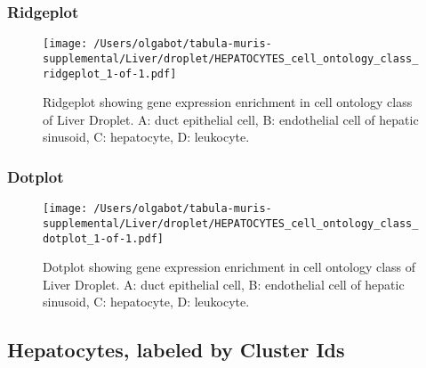 \newpage
\newpage
\subsubsection{Ridgeplot}
\begin{figure}[h]
\centering
\texttt{[image: /Users/olgabot/tabula-muris-supplemental/Liver/droplet/HEPATOCYTES\_cell\_ontology\_class\_ridgeplot\_1-of-1.pdf]}

\caption{ Ridgeplot  showing gene expression enrichment in cell ontology class of Liver Droplet. A: duct epithelial cell, B: endothelial cell of hepatic sinusoid, C: hepatocyte, D: leukocyte.}
\end{figure}


\newpage
\newpage
\subsubsection{Dotplot}
\begin{figure}[h]
\centering
\texttt{[image: /Users/olgabot/tabula-muris-supplemental/Liver/droplet/HEPATOCYTES\_cell\_ontology\_class\_dotplot\_1-of-1.pdf]}

\caption{ Dotplot  showing gene expression enrichment in cell ontology class of Liver Droplet. A: duct epithelial cell, B: endothelial cell of hepatic sinusoid, C: hepatocyte, D: leukocyte.}
\end{figure}


\newpage
\subsection{Hepatocytes, labeled by Cluster Ids}
